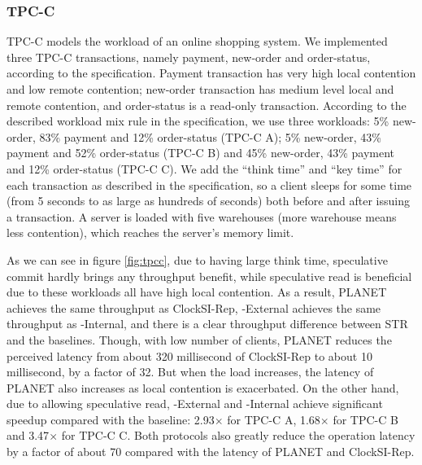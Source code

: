 \subsubsection{TPC-C}
TPC-C \cite{tpcc} models the workload of an online shopping system. We implemented three TPC-C transactions, namely payment, new-order and order-status, according to the specification. Payment transaction has very high local contention and low remote contention; new-order transaction has medium level local and remote contention, and order-status is a read-only transaction. According to the described workload mix rule in the specification, we use three workloads: 5\% new-order, 83\% payment and 12\% order-status (TPC-C A); 5\% new-order, 43\% payment and 52\% order-status (TPC-C B) and 45\% new-order, 43\% payment and 12\% order-status (TPC-C C). We add the ``think time'' and ``key time'' for each transaction as described in the specification, so a client sleeps for some time (from 5 seconds to as large as hundreds of seconds) both before and after issuing a transaction. A server is loaded with five warehouses (more warehouse means less contention), which reaches the server's memory limit.

As we can see in figure \ref{fig:tpcc}, due to having large think time, speculative commit hardly brings any throughput benefit, while speculative read is beneficial due to these workloads all have high local contention. As a result, PLANET achieves the same throughput as ClockSI-Rep, {\specula}-External achieves the same throughput as {\specula}-Internal, and there is a clear throughput difference between STR and the baselines. Though, with low number of clients, PLANET reduces the perceived latency from about 320 millisecond of ClockSI-Rep to about 10 millisecond, by a factor of 32. But when the load increases, the latency of PLANET also increases as local contention is exacerbated. On the other hand, due to allowing speculative read, {\specula}-External and {\specula-Internal} achieve significant speedup compared with the baseline: 2.93$\times$ for TPC-C A, 1.68$\times$ for TPC-C B and 3.47$\times$ for TPC-C C. Both {\specula} protocols also greatly reduce the operation latency by a factor of about 70 compared with the latency of PLANET and ClockSI-Rep.

